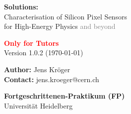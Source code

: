 \documentclass[a4paper,11pt]{article}
\newcommand{\gray}[1]{\textcolor{gray}{#1}}
\newcommand{\red}[1]{\textcolor{red}{#1}}
\newcommand\blankpage{
	\null
	\thispagestyle{empty}
	\addtocounter{page}{-1}
	\newpage
}
\begin{document}
\begin{titlepage}

\begin{center}
\vspace{-4cm}
{\Huge \textbf{Solutions:}}\\
\vspace{1cm}
{\Huge {Characterisation of Silicon Pixel Sensors}}\\
\vspace{1cm}
{\Huge {for High-Energy Physics \gray{and beyond}}}

\vspace{0.7cm}
{\large \textbf{\red{Only for Tutors}}}\\
\vspace{0.3cm}
{\large Version 1.0.2 (\today)}

\vspace{1cm}


\vspace{2.cm}
{\large \textbf{Author:} Jens Kr\"oger\\[0.3cm]}
{\large \textbf{Contact:} jens.kroeger@cern.ch }

\vspace*{\fill}
\large{\textbf{Fortgeschrittenen-Praktikum (FP)}\\}
\large{Universit\"at Heidelberg\\}

\end{center}
\afterpage{\blankpage}

\end{titlepage}

\tableofcontents
\clearpage
\end{document}
